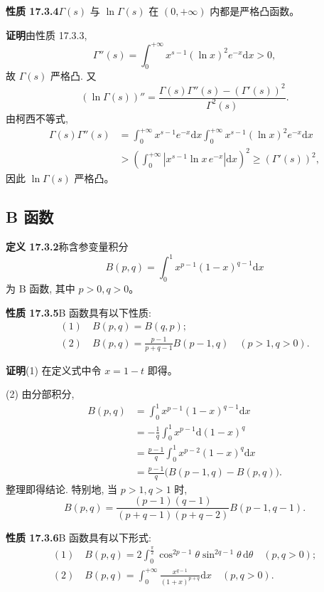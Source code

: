 \documentclass[UTF8, 12pt, fontset=fandol, oneside]{ctexart}
\begin{document}
\noindent\textbf{性质 17.3.4}\quad $\Gamma(s)$ 与 $\ln\Gamma(s)$ 在 $(0,+\infty)$ 内都是严格凸函数。

\noindent\textbf{证明}\quad 由性质 17.3.3,
\[
  \Gamma''(s)=\int_0^{+\infty}x^{s-1}(\ln x)^2e^{-x}\mathrm dx>0,
\]
故 $\Gamma(s)$ 严格凸. 又
\[
  (\ln\Gamma(s))''=\frac{\Gamma(s)\Gamma''(s)-(\Gamma'(s))^2}{\Gamma^2(s)}.
\]
由柯西不等式,
\[
\begin{aligned}
  \Gamma(s)\Gamma''(s)
  &=
  \int_0^{+\infty}x^{s-1}e^{-x}\mathrm dx
  \int_0^{+\infty}x^{s-1}(\ln x)^2e^{-x}\mathrm dx\\
  &>
  \left(\int_0^{+\infty}|x^{s-1}\ln x\,e^{-x}|\mathrm dx\right)^2
  \geqslant(\Gamma'(s))^2,
\end{aligned}
\]
因此 $\ln\Gamma(s)$ 严格凸。

\subsection{B 函数}

\noindent\textbf{定义 17.3.2}\quad 称含参变量积分
\[
  B(p,q)=\int_0^1x^{p-1}(1-x)^{q-1}\mathrm dx
\]
为 B 函数, 其中 $p>0,q>0$。

\noindent\textbf{性质 17.3.5}\quad B 函数具有以下性质:
\[
\begin{gathered}
  (1)\quad B(p,q)=B(q,p);\\
  (2)\quad B(p,q)=\frac{p-1}{p+q-1}B(p-1,q)\quad(p>1,q>0).
\end{gathered}
\]

\noindent\textbf{证明}\quad (1) 在定义式中令 $x=1-t$ 即得。

(2) 由分部积分,
\[
\begin{aligned}
  B(p,q)
  &=\int_0^1x^{p-1}(1-x)^{q-1}\mathrm dx\\
  &=-\frac1q\int_0^1x^{p-1}\mathrm d(1-x)^q\\
  &=\frac{p-1}{q}\int_0^1x^{p-2}(1-x)^q\mathrm dx\\
  &=\frac{p-1}{q}\bigl(B(p-1,q)-B(p,q)\bigr).
\end{aligned}
\]
整理即得结论. 特别地, 当 $p>1,q>1$ 时,
\[
  B(p,q)=\frac{(p-1)(q-1)}{(p+q-1)(p+q-2)}B(p-1,q-1).
\]

\noindent\textbf{性质 17.3.6}\quad B 函数具有以下形式:
\[
\begin{gathered}
  (1)\quad B(p,q)=2\int_0^{\frac\pi2}\cos^{2p-1}\theta\sin^{2q-1}\theta\,\mathrm d\theta\quad(p,q>0);\\
  (2)\quad B(p,q)=\int_0^{+\infty}\frac{x^{q-1}}{(1+x)^{p+q}}\mathrm dx\quad(p,q>0).
\end{gathered}
\]
\end{document}
